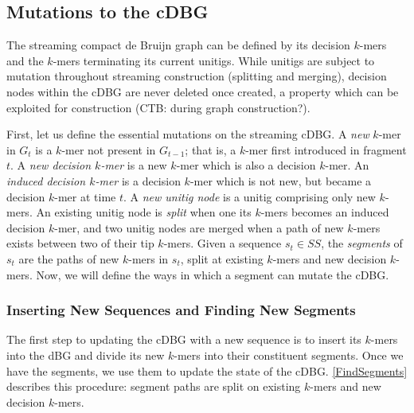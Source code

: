 \documentclass[preprint,number,12pt]{elsarticle}
\begin{document}
\subsection{Mutations to the cDBG}\label{sec:cdbg-mutations}

The streaming compact de Bruijn graph can be defined by its decision $k$-mers and the $k$-mers terminating its current unitigs. While unitigs are subject to mutation throughout streaming construction (splitting and merging), decision nodes within the cDBG are never deleted once created, a property which can be exploited for construction (CTB: during graph construction?).

First, let us define the essential mutations on the streaming cDBG. A \textit{new} $k$-mer in $G_t$ is a $k$-mer not present in $G_{t-1}$; that is, a $k$-mer first introduced in fragment $t$. A \textit{new decision $k$-mer} is a new $k$-mer which is also a decision $k$-mer. An \textit{induced decision $k$-mer} is a decision $k$-mer which is not new, but became a decision $k$-mer at time $t$. A \textit{new unitig node} is a unitig comprising only new $k$-mers. An existing unitig node is \textit{split} when one its $k$-mers becomes an induced decision $k$-mer, and two unitig nodes are merged when a path of new $k$-mers exists between two of their tip $k$-mers. Given a sequence $s_t \in SS$, the \textit{segments} of $s_t$ are the paths of new $k$-mers in $s_t$, split at existing $k$-mers and new decision $k$-mers. Now, we will define the ways in which a segment can mutate the cDBG.

\subsubsection{Inserting New Sequences and Finding New Segments}\label{sec:insertion}

The first step to updating the cDBG with a new sequence is to insert its $k$-mers into the dBG and divide its new $k$-mers into their constituent segments. Once we have the segments, we use them to update the state of the cDBG. \ref{FindSegments} describes this procedure: segment paths are split on existing $k$-mers and new decision $k$-mers.
\end{document}
